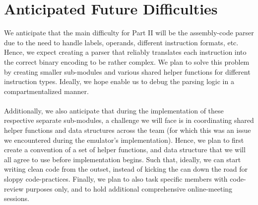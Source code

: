 \documentclass[a4paper,11pt]{article}
\begin{document}
\section{Anticipated Future Difficulties}
We anticipate that the main difficulty for Part II will be the assembly-code parser due to the need to handle labels, operands, different instruction formats, etc. Hence, we expect creating a parser that reliably translates each instruction into the correct binary encoding to be rather complex. We plan to solve this problem by creating smaller sub-modules and various shared helper functions for different instruction types. Ideally, we hope enable us to debug the parsing logic in a compartmentalized manner. \\ \\
Additionally, we also anticipate that during the implementation of these respective separate sub-modules, a challenge we will face is in coordinating shared helper functions and data structures across the team (for which this was an issue we encountered during the emulator's implementation). Hence, we plan to first create a convention of a set of helper functions, and data structure that we will all agree to use before implementation begins. Such that, ideally, we can start writing clean code from the outset, instead of kicking the can down the road for sloppy code-practices. Finally, we plan to also task specific members with code-review purposes only, and to hold additional comprehensive online-meeting sessions. 
\end{document}
